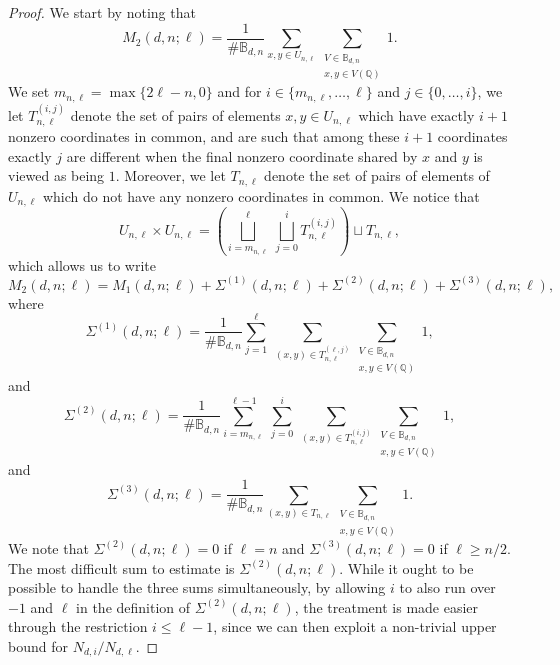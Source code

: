 \documentclass[11pt, reqno]{amsart}
\numberwithin{equation}{section}
\renewcommand{\leq}{\leqslant}
\renewcommand{\geq}{\geqslant}
\begin{document}
\begin{proof}
We start by noting that
\begin{equation*}
M_2(d,n;\ell) = \frac1{\# \mathbb{B}_{d,n}} \sum_{x, y \in U_{n,\ell}} \sum_{\substack{V \in \mathbb{B}_{d,n} \\ x, y \in V(\mathbb{Q})}} 1.
\end{equation*}
We set $m_{n,\ell} = \max\{2\ell-n,0\}$ and for $i \in \{m_{n,\ell}, \dots, \ell\}$ and $j \in \{0, \dots, i\}$, we let $T_{n,\ell}^{(i,j)}$ denote the set of pairs of elements $x, y \in U_{n,\ell}$ which have exactly $i+1$ nonzero coordinates in common, and are such that among these $i+1$ coordinates exactly $j$ are different when the final nonzero coordinate shared by $x$ and $y$ is viewed as being $1$. Moreover, we let $T_{n,\ell}$ denote the set of pairs of elements of $ U_{n,\ell}$ which do not have any nonzero coordinates in common. We notice that
\begin{equation*}
U_{n,\ell} \times U_{n,\ell} = \left( \bigsqcup_{i=m_{n,\ell}}^{\ell} \ \bigsqcup_{j=0}^i T_{n,\ell}^{(i,j)} \right) \sqcup T_{n,\ell},
\end{equation*}
which allows us to write
\begin{equation}
\label{Equality M2}
M_2(d,n;\ell) = M_1(d,n;\ell) + \Sigma^{(1)}(d,n;\ell)+\Sigma^{(2)}(d,n;\ell)+\Sigma^{(3)}(d,n;\ell),
\end{equation}
where
\begin{equation*}
\Sigma^{(1)}(d,n;\ell) = \frac1{\# \mathbb{B}_{d,n}} \sum_{j=1}^{\ell} \ \sum_{(x, y) \in T_{n,\ell}^{(\ell,j)}} \sum_{\substack{V \in \mathbb{B}_{d,n} \\ x, y \in V(\mathbb{Q})}} 1,
\end{equation*}
and
\begin{equation*}
\Sigma^{(2)}(d,n;\ell) = \frac1{\# \mathbb{B}_{d,n}} \sum_{i=m_{n,\ell}}^{\ell-1} \ \sum_{j=0}^i \ \sum_{(x, y) \in T_{n,\ell}^{(i,j)}} \sum_{\substack{V \in \mathbb{B}_{d,n} \\ x, y \in V(\mathbb{Q})}} 1,
\end{equation*}
and
\begin{equation*}
\Sigma^{(3)}(d,n;\ell) = \frac1{\# \mathbb{B}_{d,n}} \sum_{(x, y) \in T_{n,\ell}} \sum_{\substack{V \in \mathbb{B}_{d,n} \\ x, y \in V(\mathbb{Q})}} 1.
\end{equation*}
We note  that $\Sigma^{(2)}(d,n;\ell)=0$ if $\ell=n$ and $\Sigma^{(3)}(d,n;\ell)=0$ if $\ell \geq n/2$.
The most difficult sum to estimate is  
$\Sigma^{(2)}(d,n;\ell)$. While it ought to be possible to handle the three sums simultaneously, 
by allowing $i$ to also run over $-1$ and $\ell$ in the definition of $\Sigma^{(2)}(d,n;\ell)$, the treatment is  made easier through the restriction $i\leq \ell-1$, since we can then exploit a non-trivial upper bound for $N_{d,i}/N_{d,\ell}.$ 




\end{proof}
\end{document}
